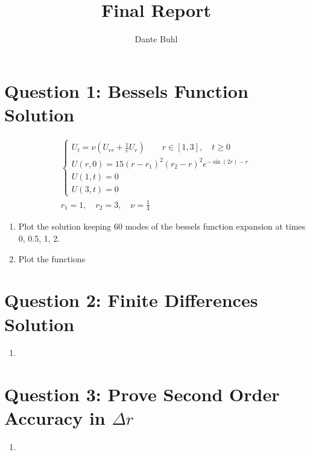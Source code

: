 \documentclass{article}
\title{Final Report}
\author{Dante Buhl}
\begin{document}
\newcommand{\bs}[1]{\boldsymbol{#1}}
\newcommand{\bmp}[1]{\begin{minipage}{#1\textwidth}}
\newcommand{\emp}{\end{minipage}}
\newcommand{\R}{\mathbb{R}}
\newcommand{\C}{\mathbb{C}}
\newcommand{\N}{\mathcal{N}}
\newcommand{\I}{\mathrm{I}}
\newcommand{\K}{\bs{\mathrm{K}}}
\newcommand{\m}{\bs{\mu}_*}
\newcommand{\s}{\bs{\Sigma}_*}
\newcommand{\dt}{\Delta t}
\newcommand{\dx}{\Delta x}
\newcommand{\tr}[1]{\text{Tr}(#1)}
\newcommand{\Tr}[1]{\text{Tr}(#1)}
\newcommand{\pd}[2]{\frac{\partial #1}{\partial #2}}

\maketitle

\section*{Question 1: Bessels Function Solution}
    \begin{align}
        \begin{cases}
            U_t = \nu\left(U_{rr} +\frac{1}{r}U_{r}\right) \quad \quad r \in [1,
            3],
            \quad t \ge 0\\
            U(r,0) = 15(r-r_1)^2(r_2-r)^2e^{-\sin(2r)-r}\\
            U(1,t) = 0\\
            U(3,t) = 0
        \end{cases} \\
        r_1 = 1, \quad r_2 = 3, \quad \nu = \frac{1}{4}
    \end{align}

\begin{enumerate}[label=\alph*)]

    \item Plot the solution keeping 60 modes of the bessels function expansion
    at times 0, 0.5, 1, 2. 

    \item Plot the functions 
\end{enumerate}

\section*{Question 2: Finite Differences Solution}
\begin{enumerate}[label=\alph*)]

    \item

\end{enumerate}

\section*{Question 3: Prove Second Order Accuracy in $\Delta r$}

\begin{enumerate}[label=\alph*)]

    \item
\end{enumerate}
\end{document}
